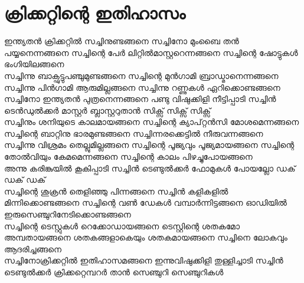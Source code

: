 \section{ക്രിക്കറ്റിന്റെ ഇതിഹാസം}
\obeylines  
\noindent
ഇന്ത്യതൻ ക്രിക്കറ്റിൽ സച്ചിനുണ്ടങ്ങനെ
സച്ചിനോ മുംബൈ തൻ പയ്യനെന്നങ്ങനെ
സച്ചിന്റെ പേർ ലിറ്റിൽമാസ്റ്ററെന്നങ്ങനെ
സച്ചിന്റെ ഷോട്ടുകൾ ഭംഗിയിലങ്ങനെ\\
സച്ചിന്നു ബാക്ഫുട്ടുപഞ്ചുമുണ്ടങ്ങനെ
സച്ചിന്റെ മുൻഗാമി ബ്രാഡ്മാനെന്നങ്ങനെ
സച്ചിന്നു പിൻഗാമി ആരുമില്ലങ്ങനെ
സച്ചിന്നു റണ്ണുകൾ ഏറിക്കൊണ്ടങ്ങനെ\\
സച്ചിനോ ഇന്ത്യതൻ പുത്രനെന്നങ്ങനെ
പണ്ടു വിഷുക്കിളി നീട്ടിപ്പാടി
\hspace{2em}സച്ചിൻ ടെൻഡുൽക്കർ
\hspace{2em}മാസ്റ്റർ ബ്ലാസ്റ്ററുതാൻ
\hspace{2em}സിക്സ് സിക്സ് സിക്സ്\\
സച്ചിനും ശനിയുടെ കാലമായങ്ങനെ
സച്ചിന്റെ ക്യാപ്റ്റൻസി മോശമെന്നങ്ങനെ
സച്ചിന്റെ ബാറ്റിനു ഭാരമുണ്ടങ്ങനെ
സച്ചിന്നരക്കെട്ടിൽ നീരുവന്നങ്ങനെ\\
സച്ചിന്നു വിശ്രമം തെല്ലുമില്ലങ്ങനെ
സച്ചിന്റെ പൂജ്യവും പൂജ്യമായങ്ങനെ
സച്ചിന്റെ തോൽവിയും കേമമെന്നങ്ങനെ
സച്ചിന്റെ കാലം പിഴച്ചുപോയങ്ങനെ\\
അന്നു കരിങ്കുയിൽ കൂകിപ്പാടി
\hspace{2em}സച്ചിൻ ടെണ്ടുൽക്കർ
\hspace{2em}ഫോമുകൾ പോയല്ലോ
\hspace{2em}ഡക് ഡക് ഡക്\\
സച്ചിന്റെ ശുക്രൻ തെളിഞ്ഞു പിന്നങ്ങനെ
സച്ചിൻ കളികളിൽ മിന്നിക്കൊണ്ടങ്ങനെ
സച്ചിന്റെ വൺ ഡേകൾ വമ്പാർന്നിട്ടങ്ങനെ
ഓഡിയിൽ ഇരുസെഞ്ചുറിനേടിക്കൊണ്ടങ്ങനെ\\
സച്ചിന്റെ ടെസ്റ്റുകൾ റെക്കോഡായങ്ങനെ
ടെസ്റ്റിന്റെ ശതകമോ അമ്പതായങ്ങനെ
ശതകങ്ങളാകെയും ശതകമായങ്ങനെ
സച്ചിനെ ലോകവും ആദരിച്ചങ്ങനെ\\
സച്ചിനോക്രിക്കറ്റിൽ ഇതിഹാസമങ്ങനെ
ഇന്നുവിഷുക്കിളി തുള്ളിച്ചാടി
\hspace{2em}സച്ചിൻ ടെണ്ടുൽക്കർ
\hspace{2em}ക്രിക്കറ്റെമ്പറർ താൻ
\hspace{2em}സെഞ്ചുറി സെഞ്ചുറികൾ
